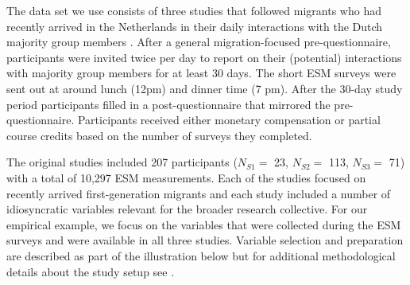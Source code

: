 The data set we use consists of three studies that followed migrants who
had recently arrived in the Netherlands in their daily interactions with
the Dutch majority group members
\citep[for the data set see][]{Kreienkamp2022b}. After a general
migration-focused pre-questionnaire, participants were invited twice per
day to report on their (potential) interactions with majority group
members for at least 30 days. The short ESM surveys were sent out at
around lunch (12pm) and dinner time (7 pm). After the 30-day study
period participants filled in a post-questionnaire that mirrored the
pre-questionnaire. Participants received either monetary compensation or
partial course credits based on the number of surveys they completed.

The original studies included 207 participants (\(N_{S1}=\) 23,
\(N_{S2}=\) 113, \(N_{S3}=\) 71) with a total of 10,297 ESM
measurements. Each of the studies focused on recently arrived
first-generation migrants and each study included a number of
idiosyncratic variables relevant for the broader research collective.
For our empirical example, we focus on the variables that were collected
during the ESM surveys and were available in all three studies. Variable
selection and preparation are described as part of the illustration
below but for additional methodological details about the study setup
see \citet[][]{Kreienkamp2022b}.
